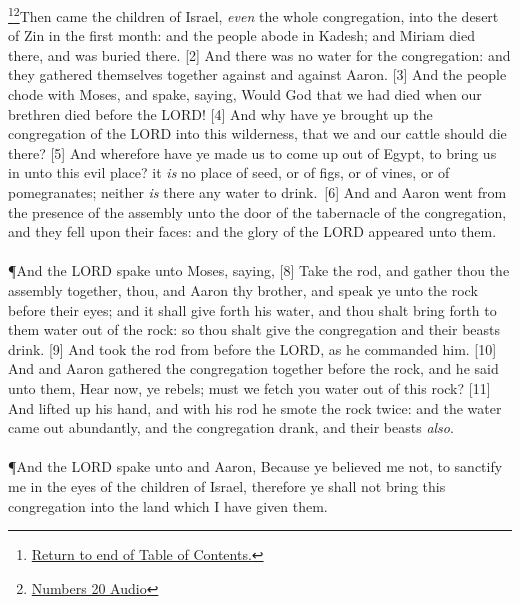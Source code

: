 \footnote{\textcolor[rgb]{0.00,0.25,0.00}{\hyperlink{NumbersTOC}{Return to end of Table of Contents.}}}\footnote{\href{https://audiobible.com/bible/numbers_20.html}{\textcolor[cmyk]{0.99998,1,0,0}{Numbers 20 Audio}}}\textcolor[cmyk]{0.99998,1,0,0}{Then came the children of Israel, \emph{even} the whole congregation, into the desert of Zin in the first month: and the people abode in Kadesh; and Miriam died there, and was buried there.}
[2] \textcolor[cmyk]{0.99998,1,0,0}{And there was no water for the congregation: and they gathered themselves together against  and against Aaron.}
[3] \textcolor[cmyk]{0.99998,1,0,0}{And the people chode with Moses, and spake, saying, Would God that we had died when our brethren died before the LORD!}
[4] \textcolor[cmyk]{0.99998,1,0,0}{And why have ye brought up the congregation of the LORD into this wilderness, that we and our cattle should die there?}
[5] \textcolor[cmyk]{0.99998,1,0,0}{And wherefore have ye made us to come up out of Egypt, to bring us in unto this evil place? it \emph{is} no place of seed, or of figs, or of vines, or of pomegranates; neither \emph{is} there any water to drink.}\
[6] \textcolor[cmyk]{0.99998,1,0,0}{And  and Aaron went from the presence of the assembly unto the door of the tabernacle of the congregation, and they fell upon their faces: and the glory of the LORD appeared unto them.}\\
\\
\P \textcolor[cmyk]{0.99998,1,0,0}{And the LORD spake unto Moses, saying,}
[8] \textcolor[cmyk]{0.99998,1,0,0}{Take the rod, and gather thou the assembly together, thou, and Aaron thy brother, and speak ye unto the rock before their eyes; and it shall give forth his water, and thou shalt bring forth to them water out of the rock: so thou shalt give the congregation and their beasts drink.}
[9] \textcolor[cmyk]{0.99998,1,0,0}{And  took the rod from before the LORD, as he commanded him.}
[10] \textcolor[cmyk]{0.99998,1,0,0}{And  and Aaron gathered the congregation together before the rock, and he said unto them, Hear now, ye rebels; must we fetch you water out of this rock?}
[11] \textcolor[cmyk]{0.99998,1,0,0}{And \fcolorbox{bone}{bone}{Moses} lifted up his hand, and with his rod he smote the rock twice: and the water came out abundantly, and the congregation drank, and their beasts \emph{also}.}\\
\\
\P \textcolor[cmyk]{0.99998,1,0,0}{And the LORD spake unto  and Aaron, Because ye believed me not, to sanctify me in the eyes of the children of Israel, therefore ye shall not bring this congregation into the land which I have given them.}

